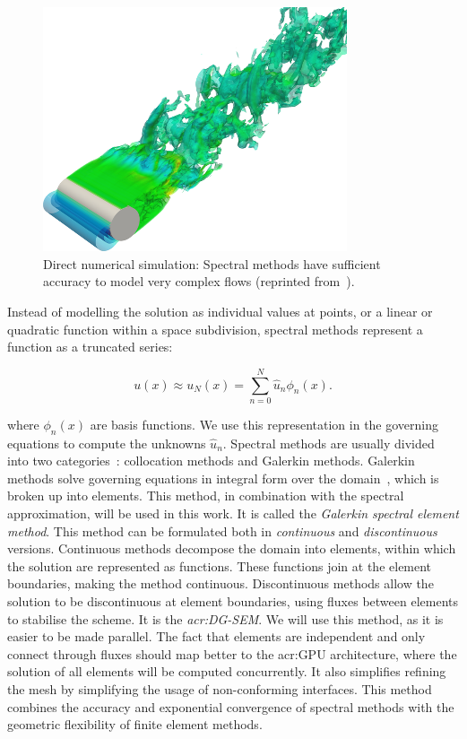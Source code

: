 \begin{figure}[H]
	\centering
	\includegraphics[width=0.8\textwidth]{Chapter_introduction/media/spectral_element_method}
	\caption{Direct numerical simulation: Spectral methods have sufficient accuracy to model very complex flows (reprinted from~\cite{Cantwell2015}).}\label{fig:intro_sem}
\end{figure}

Instead of modelling the solution as individual values at points, or a linear or quadratic function
within a space subdivision, spectral methods represent a function as a truncated series:

\begin{equation}
	u(x) \approx u_N(x) = \sum_{n = 0}^{N} \widehat{u}_n \phi _n(x).
\end{equation}

\noindent
where \(\phi _n(x)\) are basis functions. We use this representation in the governing equations to
compute the unknowns \(\widehat{u}_n\). Spectral methods are usually divided into two
categories~\cite{Karniadakis2005}: collocation methods and Galerkin methods. Galerkin methods solve
governing equations in integral form over the domain~\cite{Reed1973}, which is broken up into
elements. This method, in combination with the spectral approximation, will be used in this work. It
is called the \textit{Galerkin spectral element method}. This method can be formulated both in
\textit{continuous} and \textit{discontinuous} versions. Continuous methods decompose the domain
into elements, within which the solution are represented as functions. These functions join at the
element boundaries, making the method continuous. Discontinuous methods allow the solution to be
discontinuous at element boundaries, using fluxes between elements to stabilise the scheme. It is
the \textit{\acrfull{acr:DG-SEM}}. We will use this method, as it is easier to be made parallel. The
fact that elements are independent and only connect through fluxes should map better to the
\acrshort{acr:GPU} architecture, where the solution of all elements will be computed concurrently.
It also simplifies refining the mesh by simplifying the usage of non-conforming interfaces. This
method combines the accuracy and exponential convergence of spectral methods with the geometric
flexibility of finite element methods. 

